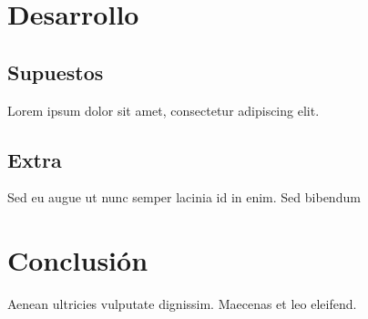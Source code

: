 \documentclass[12pt]{article}
\begin{document}
\section{Desarrollo}

\subsection{Supuestos}

Lorem ipsum dolor sit amet, consectetur adipiscing elit. 

\subsection{Extra}

Sed eu augue ut nunc semper lacinia id in enim. Sed bibendum 

\section{Conclusión}

Aenean ultricies vulputate dignissim. Maecenas et leo eleifend.
\end{document}
